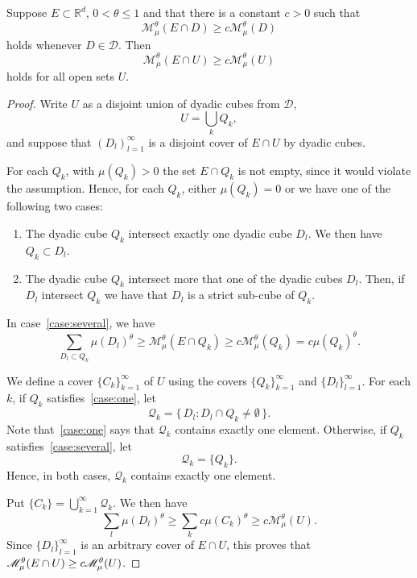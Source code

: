 \begin{lemm}\label{lem:open}
Suppose $E \subset \mathbb{R}^d$, $0 < \theta \leq 1$ and that there is a constant $c > 0$ such that
\[
\mathscr{M}_\mu^\theta (E \cap D) \geq c \mathscr{M}_\mu^\theta (D)
\]
holds whenever $D \in \mathscr{D}$. Then
\[
\mathscr{M}_\mu^\theta (E \cap U) \geq c \mathscr{M}_\mu^\theta (U)
\]
holds for all open sets $U$.
\end{lemm}

\begin{proof}
Write $U$ as a disjoint union of dyadic cubes from $\mathscr{D}$,
\[
U = \bigcup_k Q_k,
\]
and suppose that $(D_l)_{l=1}^\infty$ is a disjoint cover of $E \cap U$ by dyadic cubes.

For each $Q_k$, with $\mu (Q_k) > 0$ the set $E \cap Q_k$ is not empty, since it would violate the assumption. Hence, for each $Q_k$, either $\mu (Q_k) = 0$ or we have one of the following two cases:
\begin{enumerate}
\item \label{case:one}
The dyadic cube $Q_k$ intersect exactly one dyadic cube $D_l$. We then have $Q_k \subset D_l$.
\item \label{case:several}
The dyadic cube $Q_k$ intersect more that one of the dyadic cubes $D_l$. Then, if $D_l$ intersect $Q_k$ we have that $D_l$ is a strict sub-cube of $Q_k$.
\end{enumerate}
In case~\eqref{case:several}, we have
\[
\sum_{D_l \subset Q_k} \mu (D_l)^\theta \geq \mathscr{M}_\mu^\theta (E \cap Q_k) \geq c \mathscr{M}_\mu^\theta (Q_k) = c \mu (Q_k)^\theta.
\]

We define a cover $\{C_k\}_{k=1}^\infty$ of $U$ using the covers $\{Q_k\}_{k=1}^\infty$ and $\{D_l\}_{l=1}^\infty$. For each $k$, if $Q_k$ satisfies~\eqref{case:one}, let
\[
\mathscr{Q}_k = \{\, D_l : D_l \cap Q_k \neq \emptyset \,\}.
\]
Note that~\eqref{case:one} says that $\mathscr{Q}_k$ contains exactly one element. Otherwise, if $Q_k$ satisfies~\eqref{case:several}, let
\[
\mathscr{Q}_k = \{Q_k\}.
\]
Hence, in both cases, $\mathscr{Q}_k$ contains exactly one element.

Put $\{C_k\} = \bigcup_{k=1}^\infty \mathscr{Q}_k$. We then have
\[
\sum_l \mu (D_l)^\theta \geq \sum_k c \mu (C_k)^\theta \geq c \mathscr{M}_\mu^\theta (U).
\]
Since $\{D_l\}_{l=1}^\infty$ is an arbitrary cover of $E \cap U$, this proves that $\mathscr{M}_\mu^\theta (E \cap U) \geq\linebreak c \mathscr{M}_\mu^\theta (U)$.
\end{proof}

